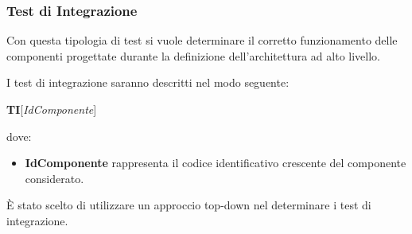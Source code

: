 \subsubsection{Test di Integrazione}
Con questa tipologia di test si vuole determinare il corretto funzionamento delle componenti progettate durante la
definizione dell'architettura ad alto livello.

I test di integrazione saranno descritti nel modo seguente:
\begin{center}
\textbf{TI}[\textit{IdComponente}]
\end{center}
dove:
\begin{itemize}
\item
\textbf{IdComponente} rappresenta il codice identificativo crescente del componente considerato.
\end{itemize}
È stato scelto di utilizzare un approccio top-down nel determinare i test di integrazione.

